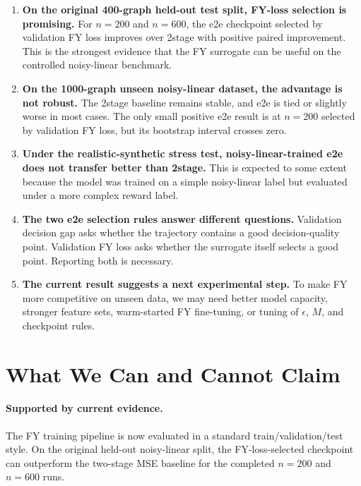 \documentclass[11pt]{article}
\begin{document}
\begin{enumerate}
    \item \textbf{On the original 400-graph held-out test split, FY-loss
    selection is promising.}
    For \(n=200\) and \(n=600\), the e2e checkpoint selected by validation FY
    loss improves over 2stage with positive paired improvement. This is the
    strongest evidence that the FY surrogate can be useful on the controlled
    noisy-linear benchmark.

    \item \textbf{On the 1000-graph unseen noisy-linear dataset, the advantage is
    not robust.}
    The 2stage baseline remains stable, and e2e is tied or slightly worse in
    most cases. The only small positive e2e result is at \(n=200\) selected by
    validation FY loss, but its bootstrap interval crosses zero.

    \item \textbf{Under the realistic-synthetic stress test, noisy-linear-trained
    e2e does not transfer better than 2stage.}
    This is expected to some extent because the model was trained on a simple
    noisy-linear label but evaluated under a more complex reward label.

    \item \textbf{The two e2e selection rules answer different questions.}
    Validation decision gap asks whether the trajectory contains a good
    decision-quality point. Validation FY loss asks whether the surrogate itself
    selects a good point. Reporting both is necessary.

    \item \textbf{The current result suggests a next experimental step.}
    To make FY more competitive on unseen data, we may need better model
    capacity, stronger feature sets, warm-started FY fine-tuning, or tuning of
    \(\epsilon\), \(M\), and checkpoint rules.
\end{enumerate}

\section{What We Can and Cannot Claim}

\paragraph{Supported by current evidence.}
The FY training pipeline is now evaluated in a standard train/validation/test
style. On the original held-out noisy-linear split, the FY-loss-selected
checkpoint can outperform the two-stage MSE baseline for the completed
\(n=200\) and \(n=600\) runs.
\end{document}
